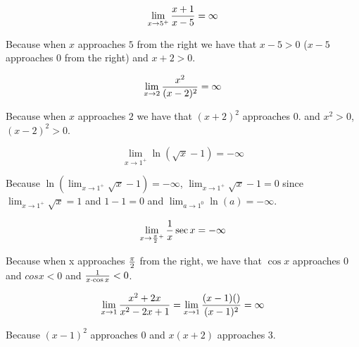 \documentclass{../../classes/anal}
\begin{document}
    \begin{problem}{29}
        \begin{equation*}
            \lim_{x\rightarrow5^+}{x+1 \over x-5} = \infty
        \end{equation*}

        Because when \(x\) approaches \(5\) from the right we have that \(x-5>0\) (\(x-5\) approaches \(0\) from the right) and \(x+2>0\).
    \end{problem}

    \begin{problem}{31}
        \begin{equation*}
            \lim_{x\rightarrow2}{x^2 \over (x-2)^2} = \infty
        \end{equation*}

        Because when \(x\) approaches \(2\) we have that \((x+2)^2\) approaches 0. and \(x^2>0\), \((x-2)^2>0\).
    \end{problem}

    \begin{problem}{33}
        \begin{equation*}
            \lim_{x\rightarrow1^+}{\ln(\sqrt{x}-1)} = -\infty
        \end{equation*}

        Because \(\ln(\lim_{x\rightarrow1^+}\sqrt{x}-1) = -\infty\), \(\lim_{x\rightarrow1^+}\sqrt{x}-1=0\) since \(\lim_{x\rightarrow1^+}\sqrt{x}=1\) and \(1-1=0\) and \(\lim_{a\rightarrow1^0}\ln(a)=-\infty\).
    \end{problem}

    \begin{problem}{35}
        \begin{equation*}
            \lim_{x\rightarrow{\pi \over 2}^+} \frac{1}{x}\sec x = -\infty
        \end{equation*}

        Because when x approaches \({\pi \over 2}\) from the right, we have that \(\cos x\) approaches 0 and \(cos x < 0\) and \({1 \over x\cdot\cos x} < 0\).
    \end{problem}

    \begin{problem}{37}
        \begin{equation*}
            \lim_{x\rightarrow1}{x^2+2x \over x^2-2x+1} = \lim_{x\rightarrow1}{(x-1)() \over (x-1)^2} = \infty
        \end{equation*}

        Because \((x-1)^2\) approaches \(0\) and \(x(x+2)\) approaches \(3\).
    \end{problem}
\end{document}
